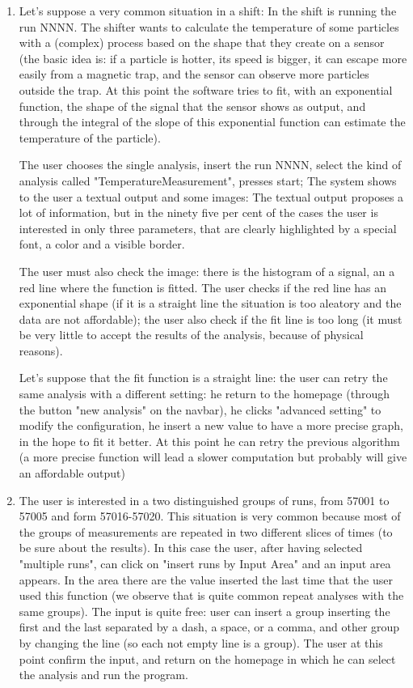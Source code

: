 \begin{enumerate}

\item
Let's suppose a very common situation in a shift: 
In the shift is running the run NNNN. The shifter wants to calculate the temperature of some particles with a (complex) process based on the shape that they create on a sensor (the basic idea is: if a particle is hotter, its speed is bigger, it can escape more easily from a magnetic trap, and the sensor can observe more particles outside the trap. At this point the software tries to fit, with an exponential function, the shape of the signal that the sensor shows as output, and through the integral of the slope of this exponential function can estimate the temperature of the particle).
 
The user chooses the single analysis, insert the run NNNN, select the kind of analysis called "TemperatureMeasurement", presses start;
The system shows to the user a textual output and some images: 
The textual output proposes a lot of information, but in the ninety five per cent of the cases the user is interested in only three parameters, that are clearly highlighted by a special font, a color and a visible border. 

The user must also check the image: there is the histogram of a signal, an a red line where the function is fitted. The user checks if the red line
has an exponential shape (if it is a straight line the situation is too aleatory and the data are not affordable); the user also check if the fit line is too long (it must be very little to accept the results of the analysis, because of physical reasons). 

Let's suppose that the fit function is a straight line: the user can retry the same analysis with a different setting: he return to the homepage (through the button "new analysis" on the navbar), he clicks "advanced setting" to modify the configuration, he insert a new value %
to have a more precise graph, in the hope to fit it better. At this point he can retry the previous algorithm (a more precise function will lead a slower computation but probably will give an affordable output)  

\item 
The user is interested in a two distinguished groups of runs, from 57001 to 57005 and form 57016-57020.
This situation is very common because most of the groups of measurements are repeated in two different slices of times (to be sure about the results).
In this case the user, after having selected "multiple runs", can click on "insert runs by Input Area" %
and an input area appears. In the area there are the value inserted the last time that the user used this function (we observe that is quite common repeat analyses with the same groups). The input is quite free: user can insert a group inserting the first and the last separated by a dash, a space, or a comma, and other group by changing the line (so each not empty line is a group). 
The user at this point confirm the input, and return on the homepage in which he can select the analysis and run the program. 


\end{enumerate}
